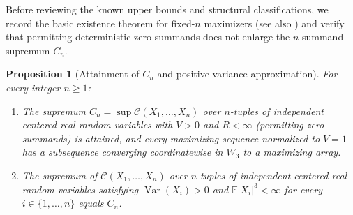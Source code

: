 \documentclass[11pt]{article}
\numberwithin{equation}{section}
\newtheorem{proposition}[theorem]{Proposition}
\theoremstyle{definition}
\theoremstyle{remark}
\DeclareMathOperator{\Var}{Var}
\newcommand{\E}{\mathbb E}
\begin{document}
Before reviewing the known upper bounds and structural classifications, we
record the basic existence theorem for fixed-$n$ maximizers (see also
\citealp[Lemma~2.1]{BellSmallStructure2026}) and verify that permitting
deterministic zero summands does not enlarge the $n$-summand supremum $C_n$.

\begin{proposition}[Attainment of $C_n$ and positive-variance approximation]\label{prop:cn-attainment}
For every integer $n\ge1$:
\begin{enumerate}[label=(\roman*),leftmargin=2em]
\item\label{it:cn-attained} The supremum $C_n=\sup\mathcal C(X_1,\ldots,X_n)$
over $n$-tuples of independent centered real random variables with $V>0$ and
$R<\infty$ (permitting zero summands) is attained, and every maximizing
sequence normalized to $V=1$ has a subsequence converging coordinatewise in
$W_3$ to a maximizing array.
\item\label{it:cn-pos-var} The supremum of $\mathcal C(X_1,\ldots,X_n)$ over
$n$-tuples of independent centered real random variables satisfying
$\Var(X_i)>0$ and $\E|X_i|^3<\infty$ for every $i\in\{1,\ldots,n\}$ equals
$C_n$.
\end{enumerate}
\end{proposition}
\end{document}
